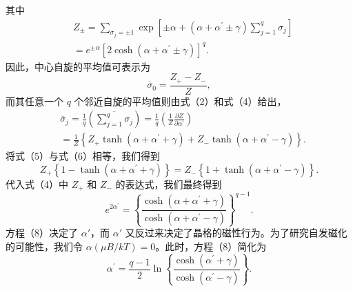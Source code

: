 其中
\begin{equation}\tag{12.5.34}\label{eq:12.5.34}
\begin{array}{rl} & { Z _ { \pm } = \sum _ { \sigma _ { j } = \pm 1 } \exp \left[ \pm \alpha + \left( \alpha + \alpha ^{\prime} \pm \gamma \right) \sum _ { j = 1 } ^{q} \sigma _ { j } \right] } \\& { = e ^{\pm \alpha} \left[ 2 \cosh \left( \alpha + \alpha ^{\prime} \pm \gamma \right) \right] ^{q} . } \end{array}
\end{equation}
因此，中心自旋的平均值可表示为
\begin{equation}\tag{12.5.35}\label{eq:12.5.35}
\overline { { \sigma } } _ { 0 } = \frac { Z _ { + } - Z _ { - } } { Z } ,
\end{equation}
而其任意一个 \(q\) 个邻近自旋的平均值则由式（2）和式（4）给出，
\begin{equation}\tag{12.5.36}\label{eq:12.5.36}
\begin{array}{rl} & { \overline { { \sigma } } _ { j } = \frac { 1 } { q } \left( \overline { { \sum _ { j = 1 } ^{q} \sigma _ { j } } } \right) = \frac { 1 } { q } \left( \frac { 1 } { Z } \frac { \partial Z } { \partial \alpha ^{\prime} } \right) } \\& { = \frac { 1 } { Z } \left\{ Z _ { + } \operatorname { t a n h } \left( \alpha + \alpha ^{\prime} + \gamma \right) + Z _ { - } \operatorname { t a n h } \left( \alpha + \alpha ^{\prime} - \gamma \right) \right\} . } \end{array}
\end{equation}
将式（5）与式（6）相等，我们得到
\begin{equation}\tag{12.5.37}\label{eq:12.5.37}
Z _ { + } \left\{ 1 - \operatorname { t a n h } \left( \alpha + \alpha ^{\prime} + \gamma \right) \right\} = Z _ { - } \left\{ 1 + \operatorname { t a n h } \left( \alpha + \alpha ^{\prime} - \gamma \right) \right\} .
\end{equation}
代入式（4）中 \(Z_{+}\) 和 \(Z_{-}\) 的表达式，我们最终得到
\begin{equation}\tag{12.5.38}\label{eq:12.5.38}
e ^{2 \alpha ^ { \prime} } = \left\{ \frac { \cosh \left( \alpha + \alpha ^{\prime} + \gamma \right) } { \cosh \left( \alpha + \alpha ^{\prime} - \gamma \right) } \right\} ^{q - 1} .
\end{equation}
方程（8）决定了 \(\alpha'\)，而 \(\alpha'\) 又反过来决定了晶格的磁性行为。为了研究自发磁化的可能性，我们令 \(\alpha(\mu B/kT)=0\)。此时，方程（8）简化为
\begin{equation}\tag{12.5.39}\label{eq:12.5.39}
\alpha ^{\prime} = \frac { q - 1 } { 2 } \ln \left\{ \frac { \cosh \left( \alpha ^{\prime} + \gamma \right) } { \cosh \left( \alpha ^{\prime} - \gamma \right) } \right\} .
\end{equation}
